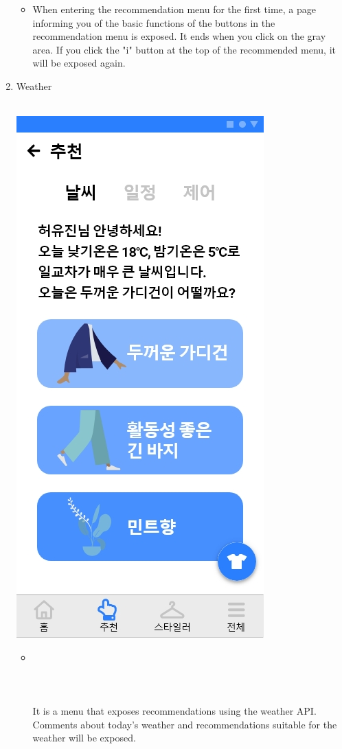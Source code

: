 \documentclass[conference]{IEEEtran}
\begin{document}
\begin{enumerate}
        \begin{itemize}
    \item[] When entering the recommendation menu for the first time, a page informing you of the basic functions of the buttons in the recommendation menu is exposed. It ends when you click on the gray area. If you click the "i" button at the top of the recommended menu, it will be exposed again. \\
\end{itemize}
     \item Weather \\ \\
     \centerline{\includegraphics[scale=0.30]{9-1. 추천(날씨).jpg}}
         \begin{itemize}
    \item[] \\ \\ \\ \\ It is a menu that exposes recommendations using the weather API. Comments about today's weather and recommendations suitable for the weather will be exposed.\\

\end{itemize}
\end{enumerate}
\end{document}
